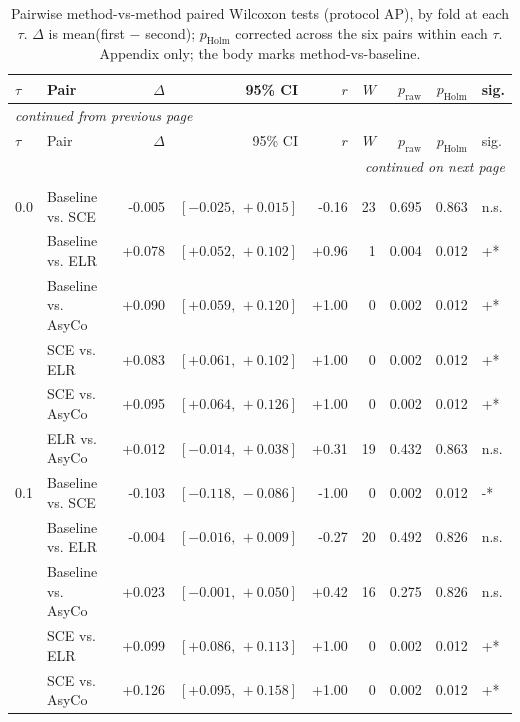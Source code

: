 
\begin{small}
\setlength{\LTcapwidth}{\textwidth}
\begin{longtable}{llrrrrrrl}
\caption{Pairwise method-vs-method paired Wilcoxon tests (protocol AP), by fold at each $\tau$. $\Delta$ is mean(first $-$ second); $p_{\mathrm{Holm}}$ corrected across the six pairs within each $\tau$. Appendix only; the body marks method-vs-baseline.}\label{tab:app_method_vs_method_AP}\\
\toprule
$\tau$ & Pair & $\Delta$ & 95\% CI & $r$ & $W$ & $p_{\mathrm{raw}}$ & $p_{\mathrm{Holm}}$ & sig. \\
\midrule
\endfirsthead
\multicolumn{9}{l}{\itshape\small continued from previous page}\\
\toprule
$\tau$ & Pair & $\Delta$ & 95\% CI & $r$ & $W$ & $p_{\mathrm{raw}}$ & $p_{\mathrm{Holm}}$ & sig. \\
\midrule
\endhead
\midrule
\multicolumn{9}{r}{\itshape\small continued on next page}\\
\endfoot
\bottomrule
\endlastfoot
\addlinespace
\multicolumn{9}{l}{\textit{Balanced accuracy}} \\
0.0 & Baseline vs. SCE & -0.005 & $[-0.025,\,+0.015]$ & -0.16 & 23 & 0.695 & 0.863 & n.s. \\
 & Baseline vs. ELR & +0.078 & $[+0.052,\,+0.102]$ & +0.96 & 1 & 0.004 & 0.012 & +* \\
 & Baseline vs. AsyCo & +0.090 & $[+0.059,\,+0.120]$ & +1.00 & 0 & 0.002 & 0.012 & +* \\
 & SCE vs. ELR & +0.083 & $[+0.061,\,+0.102]$ & +1.00 & 0 & 0.002 & 0.012 & +* \\
 & SCE vs. AsyCo & +0.095 & $[+0.064,\,+0.126]$ & +1.00 & 0 & 0.002 & 0.012 & +* \\
 & ELR vs. AsyCo & +0.012 & $[-0.014,\,+0.038]$ & +0.31 & 19 & 0.432 & 0.863 & n.s. \\
0.1 & Baseline vs. SCE & -0.103 & $[-0.118,\,-0.086]$ & -1.00 & 0 & 0.002 & 0.012 & -* \\
 & Baseline vs. ELR & -0.004 & $[-0.016,\,+0.009]$ & -0.27 & 20 & 0.492 & 0.826 & n.s. \\
 & Baseline vs. AsyCo & +0.023 & $[-0.001,\,+0.050]$ & +0.42 & 16 & 0.275 & 0.826 & n.s. \\
 & SCE vs. ELR & +0.099 & $[+0.086,\,+0.113]$ & +1.00 & 0 & 0.002 & 0.012 & +* \\
 & SCE vs. AsyCo & +0.126 & $[+0.095,\,+0.158]$ & +1.00 & 0 & 0.002 & 0.012 & +* \\

\end{longtable}
\end{small}

